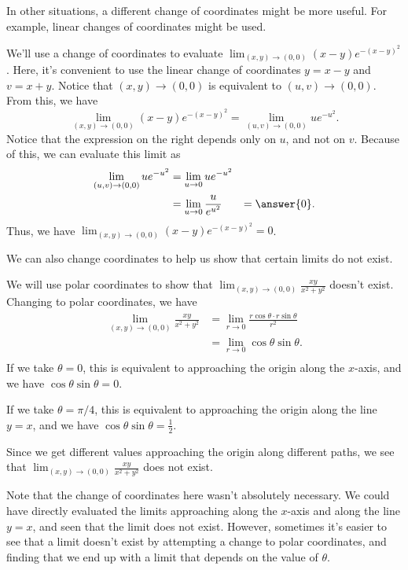 \documentclass{ximera}
\begin{document}
In other situations, a different change of coordinates might be more useful. For example, linear changes of coordinates might be used.

\begin{example}
We'll use a change of coordinates to evaluate $\lim_{(x,y)\rightarrow(0,0)} (x-y)e^{-(x-y)^2}$. Here, it's convenient to use the linear change of coordinates $y=x-y$ and $v=x+y$. Notice that $(x,y)\rightarrow (0,0)$ is equivalent to $(u,v)\rightarrow (0,0)$. From this, we have
\[
\lim_{(x,y)\rightarrow(0,0)} (x-y)e^{-(x-y)^2} = \lim_{(u,v)\rightarrow (0,0)} ue^{-u^2}.
\]
Notice that the expression on the right depends only on $u$, and not on $v$. Because of this, we can evaluate this limit as
\begin{align*}
\lim_{(u,v)\rightarrow (0,0)} ue^{-u^2} &= \lim_{u\rightarrow 0} ue^{-u^2}\\
&= \lim_{u\rightarrow 0}\frac{u}{e^{u^2}}
&= \answer{0}.
\end{align*}
Thus, we have $\lim_{(x,y)\rightarrow(0,0)} (x-y)e^{-(x-y)^2}=0$.

\end{example}

We can also change coordinates to help us show that certain limits do not exist.

\begin{example}
We will use polar coordinates to show that $\lim_{(x,y)\rightarrow (0,0)} \frac{xy}{x^2+y^2}$ doesn't exist. Changing to polar coordinates, we have
\begin{align*}
\lim_{(x,y)\rightarrow (0,0)} \frac{xy}{x^2+y^2} &= \lim_{r\rightarrow 0}\frac{r\cos\theta\cdot r\sin\theta}{r^2}\\
&= \lim_{r\rightarrow 0}\cos\theta \sin\theta.\\
\end{align*}
If we take $\theta = 0$, this is equivalent to approaching the origin along the $x$-axis, and we have $\cos\theta\sin\theta = 0$.

If we take $\theta = \pi/4$, this is equivalent to approaching the origin along the line $y=x$, and we have $\cos\theta\sin\theta = \frac{1}{2}$.

Since we get different values approaching the origin along different paths, we see that $\lim_{(x,y)\rightarrow (0,0)} \frac{xy}{x^2+y^2}$ does not exist.

Note that the change of coordinates here wasn't absolutely necessary. We could have directly evaluated the limits approaching along the $x$-axis and along the line $y=x$, and seen that the limit does not exist. However, sometimes it's easier to see that a limit doesn't exist by attempting a change to polar coordinates, and finding that we end up with a limit that depends on the value of $\theta$.
\end{example}
\end{document}
